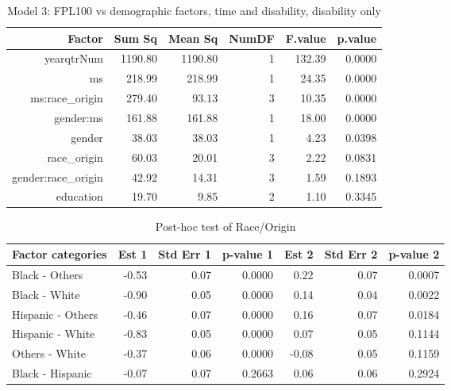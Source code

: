\begin{table}[H]
\footnotesize
\centering
\begin{tabular}{rrrrrr}
  \hline
  Factor & Sum Sq & Mean Sq & NumDF & F.value & p.value \\ 
  \hline
  yearqtrNum & 1190.80 & 1190.80 & 1 & 132.39 & 0.0000 \\ 
  ms & 218.99 & 218.99 & 1 & 24.35 & 0.0000 \\ 
  ms:race\_origin & 279.40 & 93.13 & 3 & 10.35 & 0.0000 \\ 
  gender:ms & 161.88 & 161.88 & 1 & 18.00 & 0.0000 \\ 
  gender & 38.03 & 38.03 & 1 & 4.23 & 0.0398 \\ 
  race\_origin & 60.03 & 20.01 & 3 & 2.22 & 0.0831 \\ 
  gender:race\_origin & 42.92 & 14.31 & 3 & 1.59 & 0.1893 \\ 
  education & 19.70 & 9.85 & 2 & 1.10 & 0.3345 \\ 
  \hline
\end{tabular}
\caption{Model 3: FPL100 vs demographic factors, time and disability, disability only} 
\label{tab:Anova3}
\end{table}

\begin{table}[H]
\footnotesize
\centering
\begin{tabular}{lrrrrrr}
  \hline
  Factor categories & Est 1 & Std Err 1 & p-value 1 & Est 2 & Std Err 2 & p-value 2 \\ 
  \hline
   Black - Others & -0.53 & 0.07 & 0.0000 & 0.22 & 0.07 & 0.0007 \\ 
   Black - White & -0.90 & 0.05 & 0.0000 & 0.14 & 0.04 & 0.0022 \\ 
   Hispanic - Others & -0.46 & 0.07 & 0.0000 & 0.16 & 0.07 & 0.0184 \\ 
   Hispanic - White & -0.83 & 0.05 & 0.0000 & 0.07 & 0.05 & 0.1144 \\ 
   Others - White & -0.37 & 0.06 & 0.0000 & -0.08 & 0.05 & 0.1159 \\ 
   Black - Hispanic & -0.07 & 0.07 & 0.2663 & 0.06 & 0.06 & 0.2924 \\ 
  \hline
\end{tabular}
\caption{Post-hoc test of Race/Origin} 
\label{tab:RaceOrigin}
\end{table}

